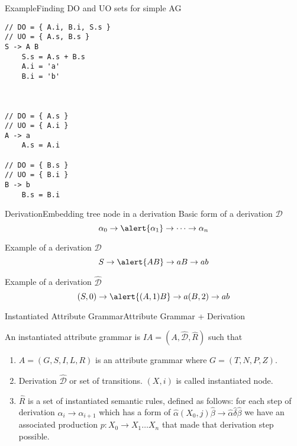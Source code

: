 \begin{frame}[fragile=singleslide]{Example}{Finding DO and UO sets for simple AG}

\begin{multicols}{2}
\begin{Verbatim}[fontsize=\small]
// DO = { A.i, B.i, S.s }
// UO = { A.s, B.s }
S -> A B
    S.s = A.s + B.s
    A.i = 'a'
    B.i = 'b'



// DO = { A.s }
// UO = { A.i }
A -> a
    A.s = A.i

// DO = { B.s }
// UO = { B.i }
B -> b
    B.s = B.i
\end{Verbatim}
\end{multicols}

\end{frame}


\begin{frame}{Derivation}{Embedding tree node in a derivation}
Basic form of a derivation $\mathscr{D}$
\[ \alpha_0 \rightarrow \alert{\alpha_1} \rightarrow \dots \rightarrow \alpha_n   \]

Example of a derivation $\mathscr{D}$
\[ S \rightarrow \alert{A B} \rightarrow a B \rightarrow a b \]

Example of a derivation $\hat{\mathscr{D}}$
\[ (S, 0) \rightarrow \alert{(A, 1) B} \rightarrow a (B, 2) \rightarrow a b  \]
\end{frame}


\begin{frame}{Instantiated Attribute Grammar}{Attribute Grammar + Derivation}
\begin{definition}
An instantiated attribute grammar is $\mathit{IA} = (A, \hat{\mathscr{D}}, \hat R)$ such that
\begin{enumerate}
	\item $A = (G, S, I, L, R)$ is an attribute grammar where  $G= (T, N, P, Z)$.
	
	\item Derivation \alert{$\hat{\mathscr{D}}$} or set of transitions. $(X, i)$ is called instantiated node.
    
    \item \alert{$\hat R$} is a set of instantiated semantic rules, defined as follows: for each step of derivation $\alpha_i \rightarrow \alpha_{i+1}$ which has a form of $\hat{\alpha}(X_0,j)\hat{\beta} \rightarrow \hat{\alpha}\hat{\delta}\hat{\beta}$ we have an associated production $p: X_0 \rightarrow X_1 \dots X_n$ that made that derivation step possible.
\end{enumerate}
\end{definition}

\end{frame}


